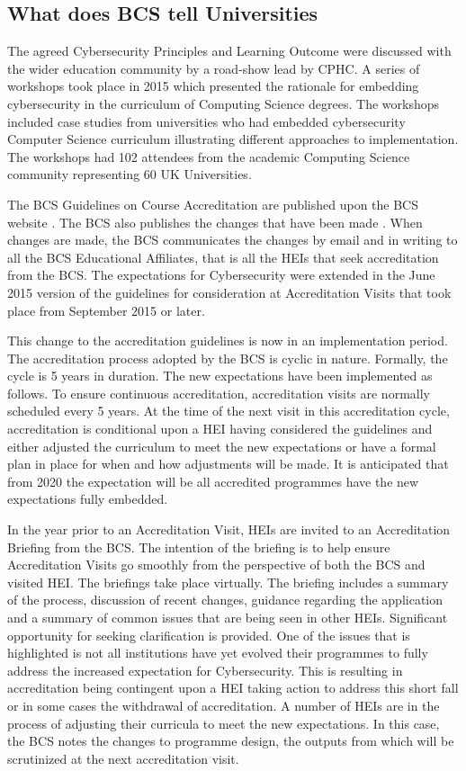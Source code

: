 \documentclass[sigconf,anonymous]{acmart}
\begin{document}
\subsection{What does BCS tell Universities}
The agreed Cybersecurity Principles and Learning Outcome \cite{CPHCISC2} were discussed with the wider education community by a road-show lead by CPHC. A series of workshops took place in 2015 which presented the rationale for embedding cybersecurity in the curriculum of Computing Science degrees. The workshops included case studies from universities who had embedded cybersecurity Computer Science curriculum illustrating different approaches to implementation. The workshops had 102 attendees from the academic Computing Science community representing 60 UK Universities. 

The BCS Guidelines on Course Accreditation are published upon the BCS website \cite{BCS2018a}. The BCS also publishes the changes that have been made \cite{BCS2018b}. When changes are made, the BCS communicates the changes by email and in writing to all the BCS Educational Affiliates, that is all the HEIs that seek accreditation from the BCS. The expectations for Cybersecurity were extended in the June 2015 version of the guidelines for consideration at Accreditation Visits that took place from September 2015 or later.

This change to the accreditation guidelines is now in an implementation period. The accreditation process adopted by the BCS is cyclic in nature. Formally, the cycle is 5 years in duration. The new expectations have been implemented as follows. To ensure continuous accreditation, accreditation visits are normally scheduled every 5 years. At the time of the next visit in this accreditation cycle, accreditation is conditional upon a HEI having considered the guidelines and either adjusted the curriculum to meet the new expectations or have a formal plan in place for when and how adjustments will be made.  It is anticipated that from 2020 the expectation will be all accredited programmes have the new expectations fully embedded.

In the year prior to an Accreditation Visit, HEIs are invited to an Accreditation Briefing from the BCS. The intention of the briefing is to help ensure Accreditation Visits go smoothly from the perspective of both the BCS and visited HEI. The briefings take place virtually. The briefing includes a summary of the process, discussion of recent changes, guidance regarding the application and a summary of common issues that are being seen in other HEIs. Significant opportunity for seeking clarification is provided. One of the issues that is highlighted is not all institutions have yet evolved their programmes to fully address the increased expectation for Cybersecurity. This is resulting in accreditation being contingent upon a HEI taking action to address this short fall or in some cases the withdrawal of accreditation. A number of HEIs are in the process of adjusting their curricula to meet the new expectations. In this case, the BCS notes the changes to programme design, the outputs from which will be scrutinized at the next accreditation visit.
\end{document}
